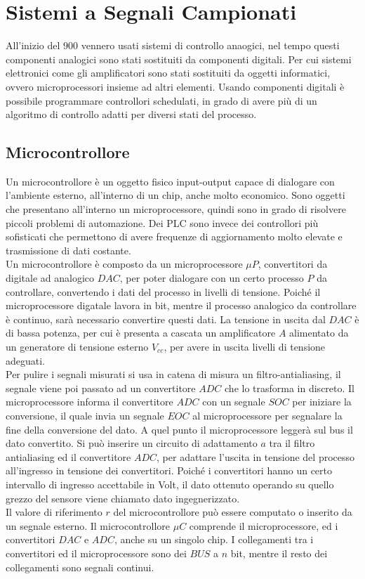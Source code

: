 \documentclass{article}
\numberwithin{equation}{subsection}
\begin{document}
\section{Sistemi a Segnali Campionati}

All'inizio del $900$ vennero usati sistemi di controllo anaogici, nel tempo questi componenti analogici sono stati sostituiti da componenti digitali. Per cui sistemi elettronici 
come gli amplificatori sono stati sostituiti da oggetti informatici, ovvero microprocessori insieme ad altri elementi. Usando componenti digitali è possibile programmare 
controllori schedulati, in grado di avere più di un algoritmo di controllo adatti per diversi stati del processo.    

\subsection{Microcontrollore}

Un microcontrollore è un oggetto fisico input-output capace di dialogare con l'ambiente esterno, all'interno di un chip, anche molto economico. Sono oggetti che presentano 
all'interno un microprocessore, quindi sono in grado di risolvere piccoli problemi di automazione. Dei PLC sono invece dei controllori più sofisticati che permettono di 
avere frequenze di aggiornamento molto elevate e trasmissione di dati costante. 
\\
Un microcontrollore è composto da un microprocessore $\mu P$, convertitori da digitale ad analogico $DAC$, per poter dialogare con un certo processo $P$ da controllare, 
convertendo i dati del processo in livelli di tensione. Poiché il microprocessore digatale lavora in bit, mentre il processo analogico da controllare è continuo, sarà 
necessario convertire questi dati. La tensione in uscita dal $DAC$ è di bassa potenza, per cui è presenta a cascata un amplificatore $A$ alimentato da un 
generatore di tensione esterno $V_{cc}$, per avere in uscita livelli di tensione adeguati. 
\\
Per pulire i segnali misurati si usa in catena di misura un filtro-antialiasing, il segnale viene poi passato ad un convertitore $ADC$ che lo trasforma in discreto. 
Il microprocessore informa il convertitore 
$ADC$ con un segnale $SOC$ per iniziare la conversione, il quale invia un segnale $EOC$ al microprocessore per segnalare la fine della conversione del dato. A quel punto 
il microprocessore leggerà sul bus il dato convertito. Si può inserire un circuito di adattamento $a$ tra il filtro antialiasing ed il convertitore $ADC$, per adattare 
l'uscita in tensione del processo all'ingresso in tensione dei convertitori. Poiché i convertitori hanno un certo intervallo di ingresso accettabile in Volt, il dato 
ottenuto operando su quello grezzo del sensore viene chiamato dato ingegnerizzato. 
\\
Il valore di riferimento $r$ del microcontrollore può essere computato o inserito da un segnale esterno. Il microcontrollore $\mu C$ comprende il microprocessore, ed i convertitori 
$DAC$ e $ADC$, anche su un singolo chip. I collegamenti tra i convertitori ed il microprocessore sono dei $BUS$ a $n$ bit, mentre il resto dei collegamenti sono 
segnali continui. 
\end{document}
